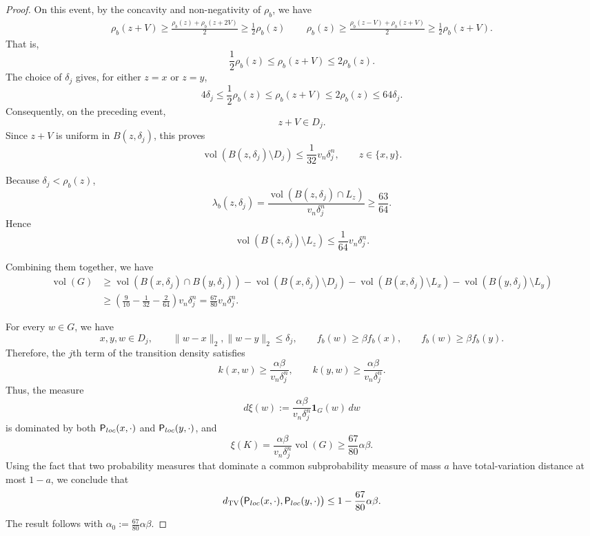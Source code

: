 \documentclass[10pt,a4paper]{amsart}
\newcommand{\dtv}{d_{\mathrm{TV}}}
\newcommand{\one}{\mathbf 1}
\newcommand{\vol}{\operatorname{vol}}
\begin{document}
\begin{proof}
On this event, by the concavity and non-negativity of $\rho_b$, we have
\begin{align*}
    \rho_b(z+V)\geq \frac{\rho_b(z)+\rho_b(z+2V)}{2}\geq \frac{1}{2}\rho_b(z)\,\qquad \rho_b(z)\geq \frac{\rho_b(z-V)+\rho_b(z+V)}{2}\geq \frac{1}{2}\rho_b(z+V).
\end{align*}
That is,
\[
 \frac12\rho_b(z)
 \le
 \rho_b(z+V)
 \le
 2\rho_b(z).
\]
The choice of $\delta_j$ gives, for either $z=x$ or $z=y$,
\[
 4\delta_j
 \le\frac{1}{2}\rho_b(z)\leq \rho_b(z+V)\leq 2\rho_b(z)
 \le64\delta_j.
\]
Consequently, on the preceding event,
\[
 z+V\in D_j.
\]
Since $z+V$ is uniform in $B(z,\delta_j)$, this proves
\begin{equation}\label{eq:band-retention}
 \vol(B(z,\delta_j)\setminus D_j)
 \le
 \frac{1}{32} v_n\delta_j^n,\qquad z\in \{x,y\}.
\end{equation}


Because $\delta_j<\rho_b(z)$,
\[
 \lambda_b(z,\delta_j)
 =
 \frac{\vol(B(z,\delta_j)\cap L_z)}{v_n \delta_j^n}
 \ge\frac{63}{64}.
\]
Hence
\begin{equation}\label{eq:density-retention}
 \vol(B(z,\delta_j)\setminus L_z)
 \le \frac{1}{64}v_n \delta_j^n.
\end{equation}

Combining them together, we have 
\begin{align*}
 \vol(G)
 &\ge
 \vol(B(x,\delta_j)\cap B(y,\delta_j))
 -\vol(B(x,\delta_j)\setminus D_j)
 -\vol(B(x,\delta_j)\setminus L_x)
 -\vol(B(y,\delta_j)\setminus L_y)\\
 &\ge
 \left(
  \frac9{10}-\frac{1}{32} - \frac{2}{64}
 \right)v_n\delta_j^n = \frac{67}{80}v_n\delta_j^n.
\end{align*}

For every $w\in G$, we have
\[
 x,y,w\in D_j,
 \qquad
 \|w-x\|_2,\|w-y\|_2\le\delta_j,\qquad
 f_b(w)\ge\beta f_b(x),
 \qquad
 f_b(w)\ge\beta f_b(y).
\]
Therefore, the $j$th term of the transition density satisfies
\[
 k(x,w)\ge\frac{\alpha\beta}{v_n\delta_j^n},
 \qquad
 k(y,w)\ge\frac{\alpha\beta}{v_n\delta_j^n}.
\]
Thus, the measure
\[
 d\xi(w)
 :=
 \frac{\alpha\beta}{v_n\delta_j^n}\one_G(w)\,dw
\]
is dominated by both
${\sf P}_{\rm loc}(x,\cdot)$ and
${\sf P}_{\rm loc}(y,\cdot)$, and
\[
 \xi(K)
 =
 \frac{\alpha\beta}{v_n\delta_j^n}\vol(G)
 \ge
  \frac{67}{80}\alpha\beta.
\]
Using the fact that two probability measures that dominate a common subprobability
measure of mass $a$ have total-variation distance at most $1-a$, we conclude that
\[
 \dtv\bigl(
 {\sf P}_{\rm loc}(x,\cdot),
 {\sf P}_{\rm loc}(y,\cdot)
 \bigr)
 \le
 1-\frac{67}{80}\alpha\beta.
\]
The result follows with
$\alpha_0:=\frac{67}{80}\alpha\beta$.
\end{proof}
\end{document}
